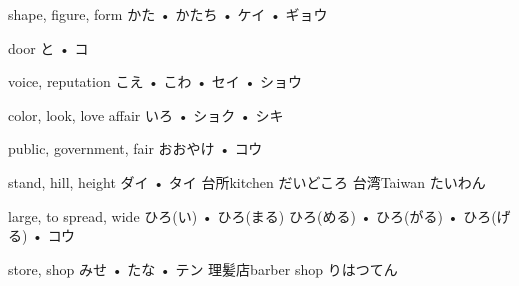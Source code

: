 



\setcounter{cardnum}{97}

		{shape, figure, form}
		{かた • かたち • ケイ • ギョウ}
		{}{}
		{}{}
		{}{}
		{}{}
		{}{}

		{door}
		{と • コ}
		{}{}
		{}{}
		{}{}
		{}{}
		{}{}

		{voice, reputation}
		{こえ • こわ • セイ • ショウ}
		{}{}
		{}{}
		{}{}
		{}{}
		{}{}

		{color, look, love affair}
		{いろ • ショク • シキ}
		{}{}
		{}{}
		{}{}
		{}{}
		{}{}

		{public, government, fair}
		{おおやけ • コウ}
		{}{}
		{}{}
		{}{}
		{}{}
		{}{}

		{stand, hill, height}
		{ダイ • タイ}
		{台所}{kitchen だいどころ}
		{台湾}{Taiwan たいわん}
		{}{}
		{}{}
		{}{}

		{large, to spread, wide}
		{ひろ(い) • ひろ(まる) ひろ(める) • ひろ(がる) • ひろ(げる) • コウ}
		{}{}
		{}{}
		{}{}
		{}{}
		{}{}

		{store, shop}
		{みせ • たな • テン}
		{理髪店}{barber shop りはつてん}
		{}{}
		{}{}
		{}{}
		{}{}

